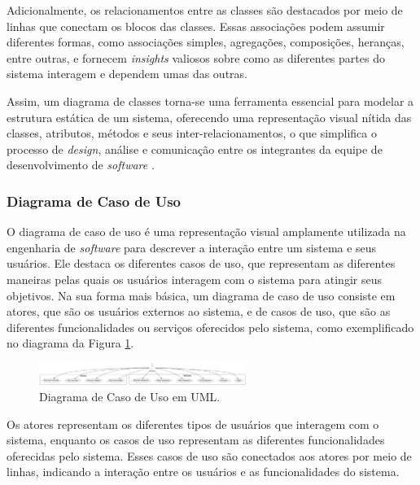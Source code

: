 Adicionalmente, os relacionamentos entre as classes são destacados por meio de linhas que conectam os blocos das classes. Essas associações podem assumir diferentes formas, como associações simples, agregações, composições, heranças, entre outras, e fornecem \textit{insights} valiosos sobre como as diferentes partes do sistema interagem e dependem umas das outras.
            
Assim, um diagrama de classes torna-se uma ferramenta essencial para modelar a estrutura estática de um sistema, oferecendo uma representação visual nítida das classes, atributos, métodos e seus inter-relacionamentos, o que simplifica o processo de \textit{design}, análise e comunicação entre os integrantes da equipe de desenvolvimento de \textit{software} \cite{softwareenguml}.
            
\subsubsection{Diagrama de Caso de Uso}
        
O diagrama de caso de uso é uma representação visual amplamente utilizada na engenharia de \textit{software} para descrever a interação entre um sistema e seus usuários. Ele destaca os diferentes casos de uso, que representam as diferentes maneiras pelas quais os usuários interagem com o sistema para atingir seus objetivos. Na sua forma mais básica, um diagrama de caso de uso consiste em atores, que são os usuários externos ao sistema, e de casos de uso, que são as diferentes funcionalidades ou serviços oferecidos pelo sistema, como exemplificado no diagrama da Figura \ref{fig:UseCaseDiagram}.
        
\begin{figure}[htb]
    \caption{\label{fig:UseCaseDiagram}Diagrama de Caso de Uso em UML.}
    \begin{center}
        \includegraphics[width=0.6\textwidth]{figuras/UseCaseDiagram.png}
    \end{center}
\end{figure}
        
Os atores representam os diferentes tipos de usuários que interagem com o sistema, enquanto os casos de uso representam as diferentes funcionalidades oferecidas pelo sistema. Esses casos de uso são conectados aos atores por meio de linhas, indicando a interação entre os usuários e as funcionalidades do sistema.
        
